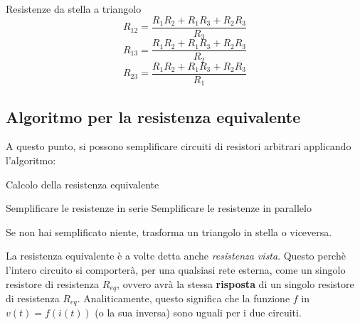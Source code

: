 \documentclass[a4paper,11pt]{article}
\begin{document}
\begin{theorem}{Resistenze da stella a triangolo}	
$$
R_{12} = \frac{R_1R_2 + R_1R_3 + R_2R_3}{R_3}
$$
$$
R_{13} = \frac{R_1R_2 + R_1R_3 + R_2R_3}{R_2}
$$
$$
R_{23} = \frac{R_1R_2 + R_1R_3 + R_2R_3}{R_1}
$$
\end{theorem}

\subsection{Algoritmo per la resistenza equivalente}
A questo punto, si possono semplificare circuiti di resistori arbitrari applicando l'algoritmo:
\begin{algorithm}
\caption{Calcolo della resistenza equivalente}
\begin{algorithmic}

	\STATE Semplificare le resistenze in serie
	\STATE Semplificare le resistenze in parallelo
	
	\STATE Se non hai semplificato niente, trasforma un triangolo in stella o viceversa.

	\ENDWHILE
\end{algorithmic}
\end{algorithm}

La resistenza equivalente è a volte detta anche \textit{resistenza vista}. 
Questo perchè l'intero circuito si comporterà, per una qualsiasi rete esterna, come un singolo resistore di resistenza $R_{eq}$, ovvero avrà la stessa \textbf{risposta} di un singolo resistore di resistenza $R_{eq}$.
Analiticamente, questo significa che la funzione $f$ in $v(t) = f(i(t))$ (o la sua inversa) sono uguali per i due circuiti.
\end{document}
